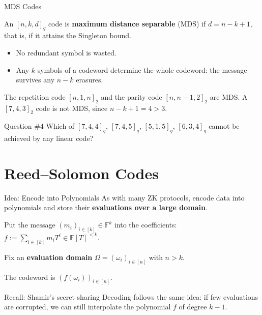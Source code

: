 \documentclass{zkdl-presentation-template}
\begin{document}
    \begin{frame}{MDS Codes}
        \begin{definition}
            An $[n,k,d]_q$ code is \textbf{maximum distance separable} (MDS) if $d = n-k+1$, that is, if it attains the Singleton bound.
        \end{definition}
        \begin{itemize}
            \item No redundant symbol is wasted.
            \item Any $k$ symbols of a codeword determine the whole codeword: the message survives any $n-k$ erasures.
        \end{itemize}
        \pause

        \begin{example}
            The repetition code $[n,1,n]_2$ and the parity code $[n,n-1,2]_2$ are MDS. A $[7,4,3]_2$ code is not MDS, since $n-k+1 = 4 > 3$.
        \end{example}
        \pause

        \begin{questionblock}{Question \#4}
            Which of $[7,4,4]_q$, $[7,4,5]_q$, $[5,1,5]_q$, $[6,3,4]_q$ cannot be achieved by any linear code?
        \end{questionblock}
    \end{frame}

    \section{Reed--Solomon Codes}

    \begin{frame}{Idea: Encode into Polynomials}
        As with many ZK protocols, encode data into polynomials and store their \textbf{evaluations over a large domain}.
        \pause
        \begin{algoen}
            \item Put the message $(m_i)_{i \in [k]} \in \mathbb{F}^k$ into the coefficients: $f := \sum_{i \in [k]}m_iT^i \in \mathbb{F}[T]^{<k}$.\pause
            \item Fix an \textbf{evaluation domain} $\Omega = (\omega_i)_{i \in [n]}$ with $n > k$.\pause
            \item The codeword is $(f(\omega_i))_{i \in [n]}$.
        \end{algoen}
        \pause

        \begin{remarkblock}{Recall: Shamir's secret sharing}
            Decoding follows the same idea: if few evaluations are corrupted, we can still interpolate the polynomial $f$ of degree $k-1$.
        \end{remarkblock}
    \end{frame}
\end{document}
